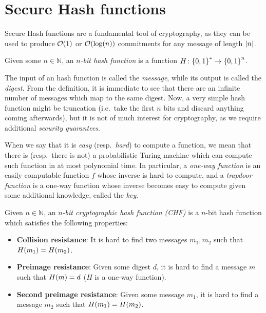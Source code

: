 \section{Secure Hash functions}
Secure Hash functions are a fundamental tool of cryptography, as they can be used to produce 
\(\BigO{1}\) or \(\BigO{\call{\log}{n}}\) commitments for any message of length \(\left\lvert n\right\rvert\).
\begin{definition}
  Given some \(n \in \mathbb{N}\), an \emph{\(n\)-bit hash function} is a function 
  \(H\colon \Set{0, 1}^{*} \to \Set{0, 1}^{n}\).
\end{definition}
The input of an hash function is called the \emph{message}, while its output is called the 
\emph{digest}.
From the definition, it is immediate to see that there are an infinite number of messages which map
to the same digest.
Now, a very simple hash function might be truncation (i.e.\ take the first \(n\) bits and discard 
anything coming afterwards), but it is not of much interest for cryptography, as we require 
additional \emph{security guarantees}.
\begin{remark}
  When we say that it is \emph{easy} (resp.\  \emph{hard}) to compute a function, we mean that 
  there is (resp.\ there is not) a probabilistic Turing machine which can compute such function in
  at most polynomial time.
  In particular, a \emph{one-way function} is an easily computable function \(f\) whose inverse is 
  hard to compute, and a \emph{trapdoor function} is a one-way function whose inverse becomes easy 
  to compute given some additional knowledge, called the \emph{key}.
\end{remark}

\begin{definition}
	Given \(n \in \mathbb{N}\), an \emph{\(n\)-bit cryptographic hash function (CHF)} is a \(n\)-bit 
  hash function which satisfies the following properties:
	\begin{itemize}
		\item \textbf{Collision resistance}: It is hard to find two messages \(m_1, m_2\) such
		      that \(\call{H}{m_1} = \call{H}{m_2}\).
		\item \textbf{Preimage resistance}: Given some digest \(d\), it is hard to find a
		      message \(m\) such that \(\call{H}{m} = d\) (\(H\) is a one-way function).
		\item \textbf{Second preimage resistance}: Given some message \(m_1\), it is hard to
		      find a message \(m_2\) such that \(\call{H}{m_1} = \call{H}{m_2}\).
	\end{itemize}
\end{definition}

